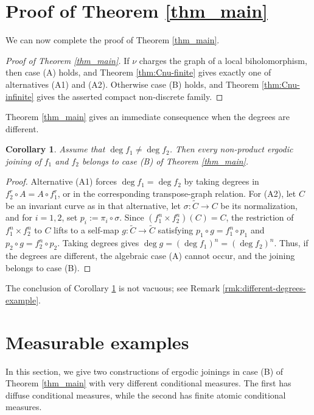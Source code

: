 \documentclass[11pt]{amsart}
\numberwithin{equation}{section}
\theoremstyle{plain}
\newtheorem{cor}[thm]{Corollary}
\theoremstyle{definition}
\theoremstyle{remark}
\begin{document}
\section{Proof of Theorem \ref{thm_main}}
\label{sec:pf-main-thm}
We can now complete the proof of Theorem \ref{thm_main}.

\begin{proof}[Proof of Theorem \ref{thm_main}]
If $\nu$ charges the graph of a local biholomorphism, then case
\textup{(A)} holds, and Theorem \ref{thm:Cnu-finite} gives exactly
one of alternatives \textup{(A1)} and \textup{(A2)}. Otherwise case
\textup{(B)} holds, and Theorem \ref{thm:Cnu-infinite} gives the
asserted compact non-discrete family.
\end{proof}

Theorem \ref{thm_main} gives an immediate consequence when the
degrees are different.

\begin{cor}\label{cor:different-degrees}
Assume that $\deg f_1\neq\deg f_2$. Then every non-product ergodic
joining of $f_1$ and $f_2$ belongs to case \textup{(B)} of
Theorem \ref{thm_main}.
\end{cor}

\begin{proof}
Alternative \textup{(A1)} forces
$\deg f_1=\deg f_2$ by taking degrees in
$f_2^r\circ A=A\circ f_1^r$, or in the corresponding transpose-graph
relation. 
For \textup{(A2)}, let $C$ be an invariant curve as in that
alternative, let
$\sigma\colon \widetilde C\to C$ be its normalization, and 
for $i=1,2$, set $p_i:=\pi_i\circ\sigma$.
Since $(f_1^n\times f_2^n)(C)=C$, the restriction of
$f_1^n\times f_2^n$ to $C$ lifts to a self-map
$g\colon \widetilde C\to\widetilde C$ satisfying
$p_1\circ g=f_1^n\circ p_1$ and 
$p_2\circ g=f_2^n\circ p_2$.
Taking degrees gives
$\deg g=(\deg f_1)^n=(\deg f_2)^n$.
Thus, if the degrees are different, the algebraic case
\textup{(A)} cannot occur, and the joining belongs to case
\textup{(B)}.
\end{proof}

The conclusion of Corollary \ref{cor:different-degrees}
is not vacuous; see
Remark \ref{rmk:different-degrees-example}.


\section{Measurable examples}
\label{sec:measurable-examples}
In this section, we give two constructions 
of ergodic joinings in case \textup{(B)} of Theorem \ref{thm_main} with very different
conditional measures. The first has diffuse conditional measures,
while the second has finite atomic conditional measures. 
\end{document}
